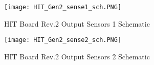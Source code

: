\begin{figure}[hb]
\centering
\texttt{[image: HIT\_Gen2\_sense1\_sch.PNG]}
\caption{HIT Board Rev.2 Output Sensors 1 Schematic}
\label{Rev2 sense1 sch}
\end{figure}

\clearpage

\begin{figure}[h]
\centering
\texttt{[image: HIT\_Gen2\_sense2\_sch.PNG]}
\caption{HIT Board Rev.2 Output Sensors 2 Schematic}
\label{Rev2 sense2 sch}
\end{figure}

